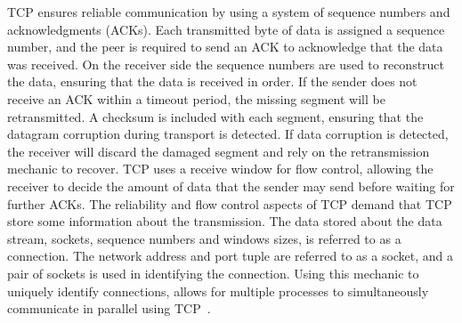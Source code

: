 \documentclass[english, 12pt, a4paper, elec, utf8, a-2b, online]{aaltothesis}
\begin{document}
TCP ensures reliable communication by using a system of sequence numbers and
acknowledgments (ACKs). Each transmitted byte of data is assigned a sequence
number, and the peer is required to send an ACK to acknowledge that the data was
received. On the receiver side the sequence numbers are used to reconstruct the
data, ensuring that the data is received in order. If the sender does not receive
an ACK within a timeout period, the missing segment will be retransmitted. A
checksum is included with each segment, ensuring that the datagram corruption during
transport is detected. If data corruption is detected, the receiver will
discard the damaged segment and rely on the retransmission mechanic to recover.
TCP uses a receive window for flow control, allowing the receiver to decide 
the amount of data that the sender may send before waiting for further ACKs. The
reliability and flow control aspects of TCP demand that TCP store some
information about the transmission. The data stored about the data stream, sockets,
sequence numbers and windows sizes, is referred to as a connection. The network
address and port tuple are referred to as a socket, and a pair of sockets is used
in identifying the connection. Using this mechanic to uniquely identify connections,
allows for multiple processes to simultaneously communicate in parallel using TCP~\cite{rfc793}.
\end{document}
